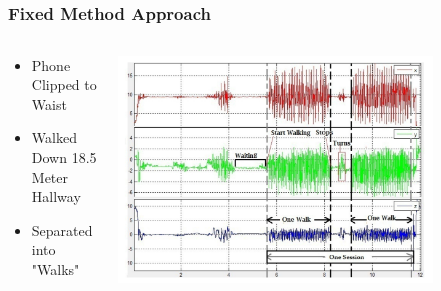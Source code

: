 \documentclass{beamer}
\begin{document}
\subsection{}
\begin{frame}
  \frametitle{Fixed Method Approach}
  \begin{columns}
  \begin{column}{0.4\textwidth}
  \begin{itemize}
    \item Phone Clipped to Waist 
  	\linebreak
  	\item Walked Down 18.5 Meter Hallway
  	\linebreak
  	\item Separated into "Walks"
  \end{itemize}
  \end{column}
  \begin{column}{0.8\textwidth}
   \includegraphics[width=0.8\textwidth]{Illustrations/gaitpatterns.png}
       \\
  \end{column}
  \end{columns}
\end{frame}
\end{document}
